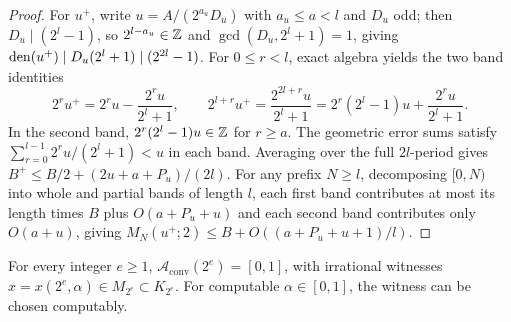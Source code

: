 \documentclass[11pt]{article}
\newcommand{\Aconv}{\mathcal{A}_{\mathrm{conv}}}
\begin{document}
\begin{proof}
For $u^+$, write $u=A/(2^{a_u}D_u)$ with $a_u\le a<l$ and $D_u$ odd; then $D_u\mid(2^l-1)$, so $2^{l-a_u}\in\mathbb Z$ and $\gcd(D_u,2^l+1)=1$, giving $\operatorname{den}(u^+)\mid D_u(2^l+1)\mid(2^{2l}-1)$. For $0\le r<l$, exact algebra yields the two band identities
\[
2^ru^+=2^ru-\frac{2^ru}{2^l+1},\qquad
2^{l+r}u^+=\frac{2^{2l+r}u}{2^l+1}=2^r(2^l-1)u+\frac{2^ru}{2^l+1}.
\]
In the second band, $2^r(2^l-1)u\in\mathbb Z$ for $r\ge a$. The geometric error sums satisfy $\sum_{r=0}^{l-1}2^ru/(2^l+1)<u$ in each band. Averaging over the full $2l$-period gives $B^+\le B/2+(2u+a+P_u)/(2l)$. For any prefix $N\ge l$, decomposing $[0,N)$ into whole and partial bands of length $l$, each first band contributes at most its length times $B$ plus $O(a+P_u+u)$ and each second band contributes only $O(a+u)$, giving $M_N(u^+;2)\le B+O((a+P_u+u+1)/l)$.
\end{proof}

\begin{theorem}\label{thm:dyadic}
For every integer $e\ge1$, $\Aconv(2^e)=[0,1]$, with irrational witnesses $x=x(2^e,\alpha)\in M_{2^e}\subset K_{2^e}$. For computable $\alpha\in[0,1]$, the witness can be chosen computably.
\end{theorem}
\end{document}
